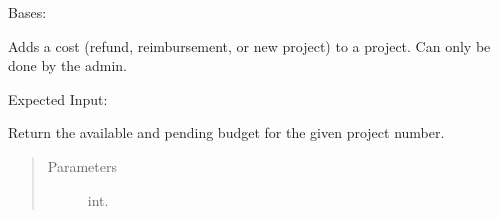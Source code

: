 \documentclass[letterpaper,10pt,english]{sphinxmanual}
\begin{document}
\begin{fulllineitems}
\label{\detokenize{apidoc/utdesign_procurement:utdesign_procurement.apigateway.ApiGateway}}
Bases: 

\begin{fulllineitems}
\label{\detokenize{apidoc/utdesign_procurement:utdesign_procurement.apigateway.ApiGateway.addCost}}
Adds a cost (refund, reimbursement, or new project) to a project.
Can only be done by the admin.

Expected Input:

\begin{sphinxVerbatim}[commandchars=\\\{\}]
     
         
       
     
        
\end{sphinxVerbatim}

\end{fulllineitems}


\begin{fulllineitems}
\label{\detokenize{apidoc/utdesign_procurement:utdesign_procurement.apigateway.ApiGateway.calculateBudget}}
Return the available and pending budget for the given project
number.
\begin{quote}\begin{description}
\item[{Parameters}] \leavevmode
{} \textendash{} int.


\end{description}
\end{quote}
\end{fulllineitems}
\end{fulllineitems}
\end{document}
